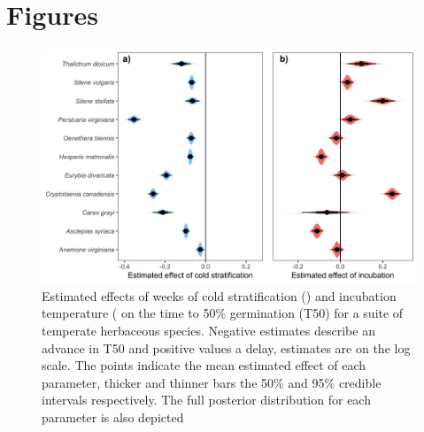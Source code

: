 \documentclass{article}\usepackage[]{graphicx}\usepackage[]{color}
\begin{document}
{\section*{Figures}
\begin{figure}[h!]
    \centering
\includegraphics[width=\textwidth]{..//figure/mus_survival.jpeg}
   \caption{Estimated effects of weeks of cold stratification () and incubation temperature ( on the time to 50\% germination (T50) for a suite of temperate herbaceous species. Negative estimates describe an advance in T50 and positive values a delay, estimates are on the log scale. The points indicate the mean estimated effect of each parameter, thicker  and thinner bars the 50\% and 95\% credible intervals respectively. The full posterior distribution for each parameter is also depicted  } 
   \label{fig:musurv}
\end{figure}


}
\end{document}
